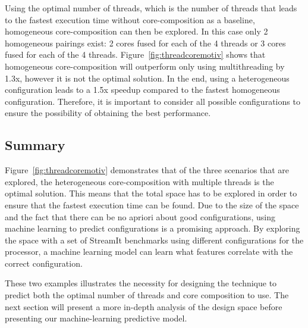Using the optimal number of threads, which is the number of threads that leads to the fastest execution time without core-composition as a baseline, homogeneous core-composition can then be explored.
In this case only 2 homogeneous pairings exist: 2 cores fused for each of the 4 threads or 3 cores fused for each of the 4 threads.
Figure~\ref{fig:threadcoremotiv} shows that homogeneous core-composition will outperform only using multithreading by 1.3x, however it is not the optimal solution.
In the end, using a heterogeneous configuration leads to a 1.5x speedup compared to the fastest homogeneous configuration.
Therefore, it is important to consider all possible configurations to ensure the possibility of obtaining the best performance.

\subsection{Summary}
Figure~\ref{fig:threadcoremotiv} demonstrates that of the three scenarios that are explored, the heterogeneous core-composition with multiple threads is the optimal solution.
This means that the total space has to be explored in order to ensure that the fastest execution time can be found.
Due to the size of the space and the fact that there can be no apriori about good configurations, using machine learning to predict configurations is a promising approach. %
By exploring the space with a set of StreamIt benchmarks using different configurations for the processor, a machine learning model can learn what features correlate with the correct configuration.

These two examples illustrates the necessity for designing the technique to predict both the optimal number of threads and core composition to use.
The next section will present a more in-depth analysis of the design space before presenting our machine-learning predictive model.
